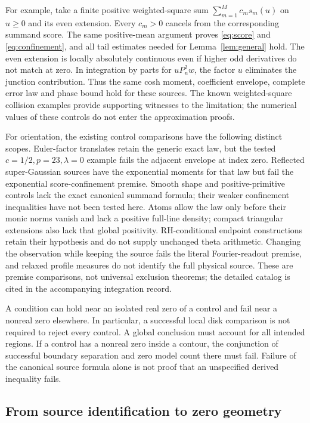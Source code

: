 For example, take a finite positive weighted-square sum
\(\sum_{m=1}^{M}c_ms_m(u)\) on \(u\ge0\) and its even extension.
Every \(c_m>0\) cancels from the corresponding summand score.
The same positive-mean argument proves \eqref{eq:score} and
\eqref{eq:confinement}, and all tail estimates needed for
Lemma~\ref{lem:general} hold. The even extension is locally absolutely
continuous even if higher odd derivatives do not match at zero.
In integration by parts for \(uP_n^2w\), the factor \(u\)
eliminates the junction contribution. Thus the same cosh moment,
coefficient envelope, complete error law and phase bound hold for
these sources. The known weighted-square collision examples
\cite{three,four} provide supporting witnesses to the limitation;
the numerical values of these controls do not enter the approximation proofs.

For orientation, the existing control comparisons have the following
distinct scopes. Euler-factor translates retain the generic exact
law, but the tested \(c=1/2,p=23,\lambda=0\) example fails the
adjacent envelope at index zero. Reflected super-Gaussian sources
have the exponential moments for that law but fail the exponential
score-confinement premise. Smooth shape and positive-primitive
controls lack the exact canonical summand formula; their weaker
confinement inequalities have not been tested here. Atoms allow the
law only before their monic norms vanish and lack a positive
full-line density; compact triangular extensions also lack that
global positivity. RH-conditional endpoint constructions retain
their hypothesis and do not supply unchanged theta arithmetic.
Changing the observation while keeping the source fails the literal
Fourier-readout premise, and relaxed profile measures do not identify
the full physical source. These are premise comparisons, not
universal exclusion theorems; the detailed catalog is cited in
the accompanying integration record.

A condition can hold near an isolated real zero of a control and
fail near a nonreal zero elsewhere. In particular, a successful
local disk comparison is not required to reject every control.
A global conclusion must account for all intended regions. If a
control has a nonreal zero inside a contour, the conjunction of
successful boundary separation and zero model count there must fail.
Failure of the canonical source formula alone is not proof that an
unspecified derived inequality fails.

\subsection{From source identification to zero geometry}

